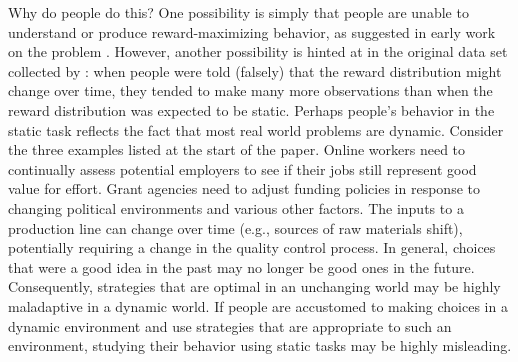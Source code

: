 \documentclass[authoryear]{elsarticle}
\begin{document}
Why do people do this? One possibility is simply that people are unable to understand or produce reward-maximizing behavior, as suggested in early work on the problem \citep{tversky_information_1966}. However, another possibility is hinted at in the original data set collected by \citet{tversky_information_1966}: when people were told (falsely) that the reward distribution might change over time, they tended to make many more observations than when the reward distribution was expected to be static. Perhaps people's behavior in the static task reflects the fact that most real world problems are dynamic. Consider the three examples listed at the start of the paper. Online workers need to continually assess potential employers to see if their jobs still represent good value for effort. Grant agencies need to adjust funding policies in response to changing political environments and various other factors. The inputs to a production line can change over time (e.g., sources of raw materials shift), potentially requiring a change in the quality control process. In general, choices that were a good idea in the past may no longer be good ones in the future. Consequently, strategies that are optimal in an unchanging world may be highly maladaptive in a dynamic world. If people are accustomed to making choices in a dynamic environment and use strategies that are appropriate to such an environment, studying their behavior using static tasks may be highly misleading.
\end{document}
